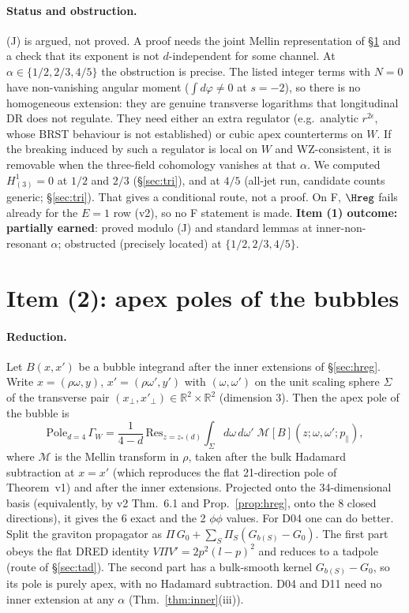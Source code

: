\paragraph{Status and obstruction.} (J) is argued, not proved. A proof needs the joint Mellin representation of \S\ref{sec:bubbles} and a check that its exponent is not $d$-independent for some channel. At $\alpha\in\{1/2,2/3,4/5\}$ the obstruction is precise. The listed integer terms with $N=0$ have non-vanishing angular moment ($\int d\varphi\ne0$ at $s=-2$), so there is no homogeneous extension: they are genuine transverse logarithms that longitudinal DR does not regulate. They need either an extra regulator (e.g.\ analytic $r^{2\epsilon}$, whose BRST behaviour is not established) or cubic apex counterterms on $W$. If the breaking induced by such a regulator is local on $W$ and WZ-consistent, it is removable when the three-field cohomology vanishes at that $\alpha$. We computed $H^1_{(3)}=0$ at $1/2$ and $2/3$ (\S\ref{sec:tri}), and at $4/5$ (all-jet run, candidate counts generic; \S\ref{sec:tri}). That gives a conditional route, not a proof. On F, $\Hreg$ fails already for the $E=1$ row (v2), so no F statement is made.
\textbf{Item (1) outcome: partially earned}: proved modulo (J) and standard lemmas at inner-non-resonant $\alpha$; obstructed (precisely located) at $\{1/2,2/3,4/5\}$.

\section{Item (2): apex poles of the bubbles}\label{sec:bubbles}
\paragraph{Reduction.} Let $B(x,x')$ be a bubble integrand after the inner extensions of \S\ref{sec:hreg}. Write $x=(\rho\omega,y)$, $x'=(\rho\omega',y')$ with $(\omega,\omega')$ on the unit scaling sphere $\Sigma$ of the transverse pair $(x_\perp,x'_\perp)\in\mathbb R^2\times\mathbb R^2$ (dimension 3). Then the apex pole of the bubble is
\[ \mathrm{Pole}_{d=4}\,\Gamma_W=\frac{1}{4-d}\,\mathrm{Res}_{z=z_*(d)}\int_\Sigma d\omega\,d\omega'\;\mathcal M[B](z;\omega,\omega';p_\parallel), \]
where $\mathcal M$ is the Mellin transform in $\rho$, taken after the bulk Hadamard subtraction at $x=x'$ (which reproduces the flat 21-direction pole of Theorem~v1) and after the inner extensions. Projected onto the 34-dimensional basis (equivalently, by v2 Thm.~6.1 and Prop.~\ref{prop:hreg}, onto the 8 closed directions), it gives the 6 exact and the 2 $\phi\phi$ values. For D04 one can do better. Split the graviton propagator as $\Pi\,G_0+\sum_S\Pi_S(G_{b(S)}-G_0)$. The first part obeys the flat DRED identity $V\Pi V'=2p^2(l-p)^2$ and reduces to a tadpole (route of \S\ref{sec:tad}). The second part has a bulk-smooth kernel $G_{b(S)}-G_0$, so its pole is purely apex, with no Hadamard subtraction. D04 and D11 need no inner extension at any $\alpha$ (Thm.~\ref{thm:inner}(iii)).
